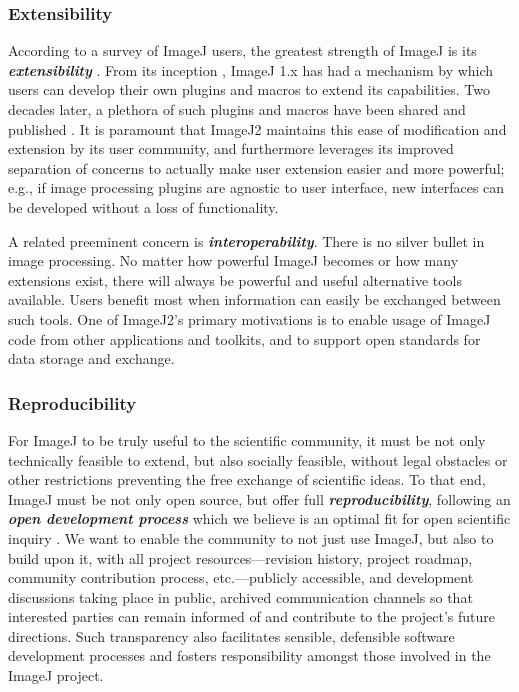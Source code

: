 \documentclass{bmcart}
\begin{document}
\subsubsection*{Extensibility}
According to a survey of ImageJ users, the greatest strength of ImageJ is its
\textbf{\textit{extensibility}} \cite{imagej_survey}. From its inception
\cite{imagej_history},
ImageJ 1.x has had a mechanism by which users can develop their own plugins and
macros to extend its capabilities. Two decades later, a plethora of such
plugins and macros have been shared and published \cite{imagej_ecosystem}. It
is paramount that ImageJ2 maintains this ease of modification and extension by
its user community, and furthermore leverages its improved separation of
concerns to actually make user extension easier and more powerful; e.g., if
image processing plugins are agnostic to user interface, new interfaces can be
developed without a loss of functionality.

A related preeminent concern is \textbf{\textit{interoperability}}. There is no
silver bullet in image processing. No matter how powerful ImageJ becomes or how
many extensions exist, there will always be powerful and useful alternative
tools available. Users benefit most when information can easily be exchanged
between such tools. One of ImageJ2's primary motivations is to enable usage of
ImageJ code from other applications and toolkits, and to support open standards
for data storage and exchange.

\subsubsection*{Reproducibility}
For ImageJ to be truly useful to the scientific community, it must be not only
technically feasible to extend, but also socially feasible, without legal
obstacles or other restrictions preventing the free exchange of scientific
ideas. To that end, ImageJ must be not only open source, but offer full
\textbf{\textit{reproducibility}}, following an \textbf{\textit{open
development process}} which we believe is an optimal fit for open scientific
inquiry \cite{software_usability}. We want to enable the community to not just
use ImageJ, but also to build upon it, with all project resources---revision
history, project roadmap, community contribution process, etc.---publicly
accessible, and development discussions taking place in public, archived
communication channels so that interested parties can remain informed of and
contribute to the project's future directions. Such transparency also
facilitates sensible, defensible software development processes and fosters
responsibility amongst those involved in the ImageJ project.
\end{document}
